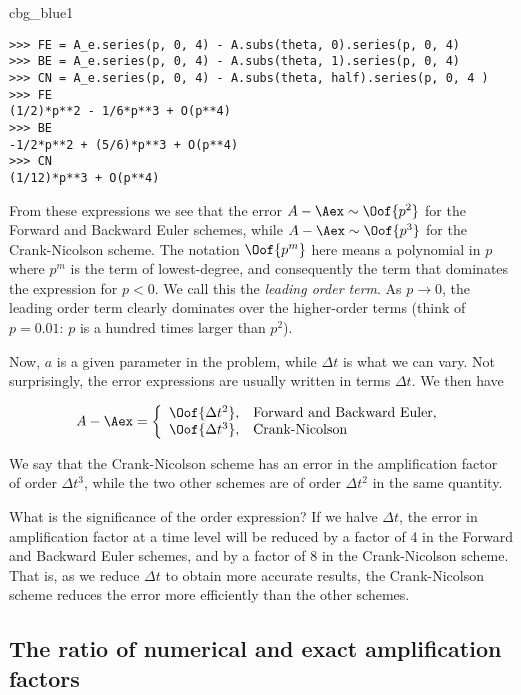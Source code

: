 \documentclass[graybox,sectrefs,envcountresetchap,open=right,final]{svmonodo}
\newenvironment{_cod_tight}[1]{
   \def\FrameCommand{\colorbox{#1}}
   \FrameRule0.6pt\MakeFramed {\FrameRestore}\vskip3mm}
   {\vskip0mm\endMakeFramed}
\newenvironment{cod}[1]{
\bgroup\rmfamily
\fboxsep=0mm\relax
\begin{_cod_tight}{#1}
\list{}{\parsep=-2mm\parskip=0mm\topsep=0pt\leftmargin=2mm
\rightmargin=2\leftmargin\leftmargin=4pt\relax}
\item\relax}
{\endlist\end{_cod_tight}\egroup}
\begin{document}
\begin{cod}{cbg_blue1}\begin{Verbatim}[numbers=none,fontsize=\fontsize{9pt}{9pt},baselinestretch=0.95,xleftmargin=2mm]
>>> FE = A_e.series(p, 0, 4) - A.subs(theta, 0).series(p, 0, 4)
>>> BE = A_e.series(p, 0, 4) - A.subs(theta, 1).series(p, 0, 4)
>>> CN = A_e.series(p, 0, 4) - A.subs(theta, half).series(p, 0, 4 )
>>> FE
(1/2)*p**2 - 1/6*p**3 + O(p**4)
>>> BE
-1/2*p**2 + (5/6)*p**3 + O(p**4)
>>> CN
(1/12)*p**3 + O(p**4)
\end{Verbatim}
\end{cod}
\noindent
From these expressions we see that the error $A-\Aex\sim \Oof{p^2}$
for the Forward and Backward Euler schemes, while
$A-\Aex\sim \Oof{p^3}$ for the Crank-Nicolson scheme.
The notation $\Oof{p^m}$ here means a polynomial in $p$ where
$p^m$ is the term of lowest-degree, and consequently the term that
dominates the expression for $p < 0$. We call this the
\emph{leading order term}. As $p\rightarrow 0$, the leading order term
clearly dominates over the higher-order terms (think of $p=0.01$:
$p$ is a hundred times larger than $p^2$).

Now, $a$ is a given parameter in the problem, while $\Delta t$ is
what we can vary. Not surprisingly, the error expressions are usually
written in terms $\Delta t$. We then have

\begin{equation}
A-\Aex = \left\lbrace\begin{array}{ll}
\Oof{\Delta t^2}, & \hbox{Forward and Backward Euler},\\ 
\Oof{\Delta t^3}, & \hbox{Crank-Nicolson}
\end{array}\right.
\end{equation}

We say that the Crank-Nicolson scheme has an error in the amplification
factor of order $\Delta t^3$, while the two other schemes are
of order $\Delta t^2$ in the same quantity.

What is the significance of the order expression? If we halve $\Delta t$,
the error in amplification factor at a time level will be reduced
by a factor of 4 in the Forward and Backward Euler schemes, and by
a factor of 8 in the Crank-Nicolson scheme. That is, as we
reduce $\Delta t$ to obtain more accurate results, the Crank-Nicolson
scheme reduces the error more efficiently than the other schemes.


\subsection{The ratio of numerical and exact amplification factors}
\end{document}
